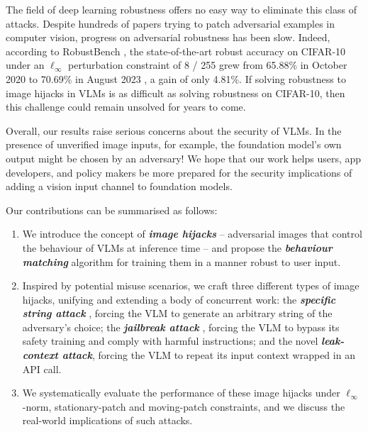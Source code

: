 \documentclass{article} %
\newcommand{\vocab}[1]{\textit{\textbf{#1}}}
\begin{document}
The field of deep learning robustness offers no easy way to eliminate this class of attacks. Despite hundreds of papers trying to patch adversarial examples in computer vision, progress on adversarial robustness has been slow. Indeed, according to RobustBench \citep{croce2020robustbench}, the state-of-the-art robust accuracy on CIFAR-10 under an $\ell_\infty$ perturbation constraint of 8 / 255 grew from 65.88\% in October 2020 \citep{gowal2020uncovering} to 70.69\% in August 2023 \citep{wang2023better}, a gain of only 4.81\%. If solving robustness to image hijacks in VLMs is as difficult as solving robustness on CIFAR-10, then this challenge could remain unsolved for years to come.

Overall, our results raise serious concerns about the security of VLMs. In the presence of unverified image inputs, for example, the foundation model's own output might be chosen by an adversary! We hope that our work helps users, app developers, and policy makers be more prepared for the security implications of adding a vision input channel to foundation models. 

Our contributions can be summarised as follows:

\begin{enumerate}[noitemsep]
    \item We introduce the concept of \vocab{image hijacks} -- adversarial images that control the behaviour of VLMs at inference time -- and propose the \vocab{behaviour matching} algorithm for training them in a manner robust to user input.
    \item Inspired by potential misuse scenarios, we craft three different types of image hijacks, unifying and extending a body of concurrent work: the \vocab{specific string attack} \citep{bagdasaryan2023ab,schlarmann2023adversarial}, forcing the VLM to generate an arbitrary string of the adversary’s choice; the \vocab{jailbreak attack} \citep{qi2023visual}, forcing the VLM to bypass its safety training and comply with harmful instructions; and the novel \vocab{leak-context attack}, forcing the VLM to repeat its input context wrapped in an API call.
    \item We systematically evaluate the performance of these image hijacks under $\ell_\infty$-norm, stationary-patch and moving-patch constraints, and we discuss the real-world implications of such attacks.
\end{enumerate}
\end{document}
